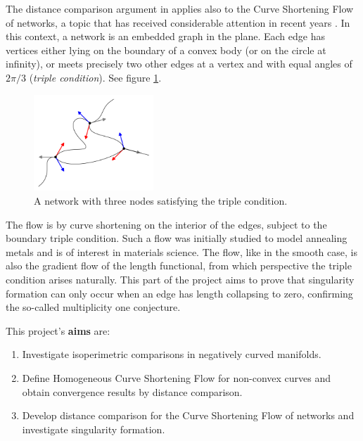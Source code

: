 \documentclass[12pt]{amsart}
\begin{document}
The distance comparison argument in \cite{MR2794630} applies also to the Curve Shortening Flow of networks, a topic that has received considerable attention in recent years \cite{MR2394409,MR2075985,MR2763716}. In this context, a network is an embedded graph in the plane. Each edge has vertices either lying on the boundary of a convex body (or on the circle at infinity), or meets precisely two other edges at a vertex and with equal angles of $2\pi/3$ (\emph{triple condition}). See figure \ref{fg:network}.
\begin{figure}[htb]
\centering
\includegraphics[width=0.4\textwidth]{img/network.png}
\caption{\label{fg:network}A network with three nodes satisfying the triple condition.}
\end{figure}

The flow is by curve shortening on the interior of the edges, subject to the boundary triple condition. Such a flow was initially studied to model annealing metals \cite{MR0078836} and is of interest in materials science. The flow, like in the smooth case, is also the gradient flow of the length functional, from which perspective the triple condition arises naturally. This part of the project aims to prove that singularity formation can only occur when an edge has length collapsing to zero, confirming the so-called multiplicity one conjecture.

This project's \textbf{aims} are:
\begin{enumerate}[label=\textbf{(A.\arabic*)}]
\item Investigate isoperimetric comparisons in negatively curved manifolds.
\item Define Homogeneous Curve Shortening Flow for non-convex curves and obtain convergence results by distance comparison.
\item Develop distance comparison for the Curve Shortening Flow of networks and investigate singularity formation.
\end{enumerate}
\end{document}
